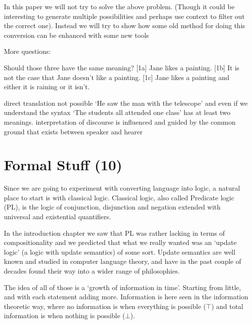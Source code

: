 \documentclass[12pt]{article}
\let\stdsection\section
\renewcommand\section{\newpage\stdsection}
\begin{document}
In this paper we will not try to solve the above problem. (Though it could be interesting to generate multiple possibilities and perhaps use context to filter out the correct one). Instead we will try to show how some old method for doing this conversion can be enhanced with some new tools






More questions:

Should those three have the same meaning?
[1a]  Jane likes a painting.
[1b]  It is not the case that Jane doesn't like a painting.
[1c]  Jane likes a painting and either it is raining or it isn't.

direct translation not possible
`He saw the man with the telescope'
and even if we understand the syntax
`The students all attended one class'
has at least two meanings.
interpretation of discourse is influenced and guided by the common ground that exists between speaker and hearer


\section{Formal Stuff (10)}


Since we are going to experiment with converting language into logic, a natural place to start is with classical logic. Classical logic, also called Predicate logic (PL), is the logic of conjunction, disjunction and negation extended with universal and existential quantifiers.

In the introduction chapter we saw that PL was rather lacking in terms of compositionality and we predicted that what we really wanted was an `update logic' (a logic with update semantics) of some sort. Update semantics are well known and studied in computer language theory, and have in the past couple of decades found their way into a wider range of philosophies.

The idea of all of those is a `growth of information in time'. Starting from little, and with each statement adding more. Information is here seen in the information theoretic way, where no information is when everything is possible ($\top$) and total information is when nothing is possible ($\bot$).
\end{document}
